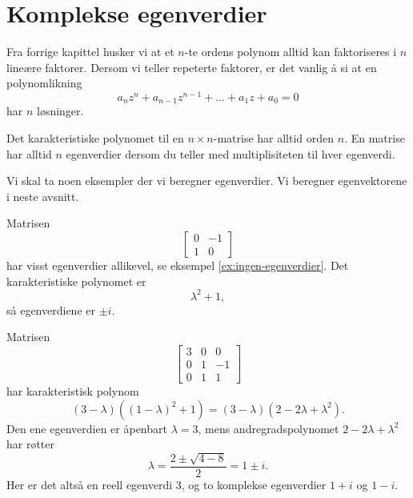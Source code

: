 



\section*{Komplekse egenverdier}
Fra forrige kapittel husker vi at et $n$-te ordens polynom alltid kan faktoriseres i $n$ lineære faktorer. Dersom vi teller repeterte faktorer, er det vanlig å si at en polynomlikning 
\[
a_n z^n+a_{n-1} z^{n-1}+...+a_1 z +a_0=0
\]
har $n$ løsninger.

\begin{thm}
Det karakteristiske polynomet til en $n\times n$-matrise har alltid orden $n$. 
En matrise har alltid $n$ egenverdier dersom du 
teller med multiplisiteten til hver egenverdi. 
\end{thm}

Vi skal ta noen eksempler der vi beregner egenverdier. Vi beregner egenvektorene i neste avsnitt.

\begin{ex}
Matrisen
\[
\begin{bmatrix}
0 & -1 \\ 1 &0
\end{bmatrix}
\]
har visst egenverdier allikevel, se eksempel \ref{ex:ingen-egenverdier}. Det karakteristiske polynomet er
\[
\lambda^2+1,
\]
så egenverdiene er $\pm i$. 
\end{ex}

\begin{ex}
Matrisen
\[
\begin{bmatrix}
3 & 0 & 0 \\ 0 & 1 & -1 \\ 0&  1 &1  
\end{bmatrix}
\]
har karakteristisk polynom
\[
(3-\lambda)((1-\lambda)^2+1)=(3-\lambda)(2-2\lambda+\lambda^2).
\]
Den ene egenverdien er åpenbart $\lambda=3$, mens andregradspolynomet $2-2\lambda+\lambda^2$ har røtter
\[
\lambda=\frac{2\pm\sqrt{4-8}}{2}=1\pm i.
\] 
Her er det altså en reell egenverdi $3$, og to komplekse egenverdier $1+i$ og $1-i$.
\end{ex}

